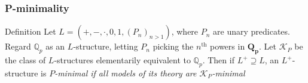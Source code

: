 \begin{frame}[t]\frametitle{P-minimality}
    
	\begin{beamerboxesrounded}[shadow=true]{Definition}
		Let $L=(+,-,\cdot,0,1,(P_{n})_{n>1})$, where $P_n$ are unary
		predicates. Regard $\mathbb{Q}_p$ as an $L$-structure, letting $P_n$ picking the $n^{\text{th}}$ powers in $\mathbf{Q_p}$.
		Let $\mathcal{K}_P$ be the class of $L$-structures elementarily equivalent to $\mathbb{Q}_p$. 
		Then if $L^{+}\supseteq L$, an $L^{+}$-structure is \em $P$-minimal \em
		if all models of its theory are $\mathcal{K}_P$-minimal
	\end{beamerboxesrounded}

\end{frame}